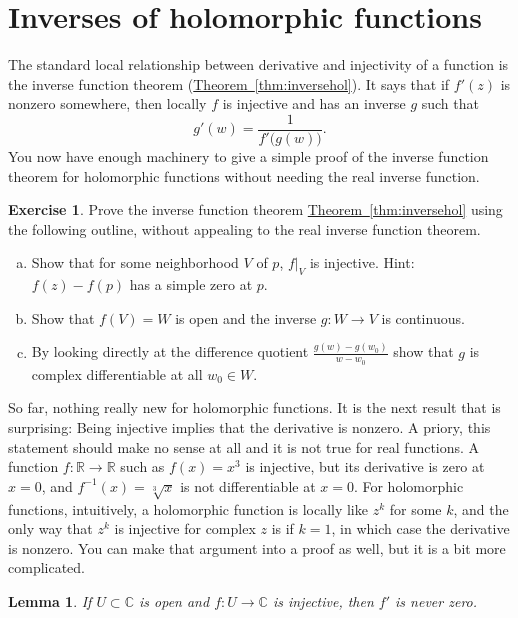 \documentclass[12pt,openany]{book}
\newcommand{\C}{{\mathbb{C}}}
\newcommand{\R}{{\mathbb{R}}}
\theoremstyle{plain}
\newtheorem{lemma}[thm]{Lemma}
\theoremstyle{remark}
\theoremstyle{definition}
\newenvironment{exbox}{%
    \def\FrameCommand{\vrule width 1pt \relax\hspace{10pt}}%
    \MakeFramed{\advance\hsize-\width\FrameRestore}%
}{%
    \endMakeFramed
}
\newenvironment{exparts}{%
    \leavevmode\begin{enumerate}[a),noitemsep,topsep=0pt,parsep=0pt,partopsep=0pt]
}{%
    \end{enumerate}
}
\theoremstyle{exercise}
\newtheorem{exercise}{Exercise}[section]
\theoremstyle{example}
\newcommand{\thmref}[1]{\hyperref[#1]{Theorem~\ref*{#1}}}
\begin{document}
\section{Inverses of holomorphic functions} \label{sec:inverses}

The standard local relationship between derivative and injectivity of a
function is the inverse function theorem (\thmref{thm:inversehol}).
It says that if $f'(z)$ is nonzero somewhere, then locally $f$ is
injective and has an inverse $g$ such that
\begin{equation*}
g'(w) = \frac{1}{f'\bigl(g(w)\bigr)} .
\end{equation*}
You now have enough machinery to give a simple proof
of the inverse function theorem for holomorphic functions
without needing the real inverse function.

\begin{exbox}
\begin{exercise}
Prove the inverse function theorem \thmref{thm:inversehol}
using the following outline, without appealing to the real inverse function
theorem.
\begin{exparts}
\item Show that for some neighborhood $V$ of $p$, $f|_V$ is injective.
Hint: $f(z)-f(p)$ has a simple zero at $p$.
\item Show that $f(V) = W$ is open and the inverse $g \colon W \to V$ is
continuous.
\item By looking directly at the difference quotient $\frac{g(w)-g(w_0)}{w-w_0}$
show that $g$ is complex differentiable at all $w_0 \in W$.
\end{exparts}
\end{exercise}
\end{exbox}

So far, nothing really new for holomorphic functions.
It is the next
result that is surprising: Being injective
implies that the derivative is nonzero.
A priory, this statement should make no sense at all and it is not true for real functions.
A function $f \colon \R \to \R$ such as $f(x) = x^3$
is injective, but its derivative is zero at $x=0$, and $f^{-1}(x) =
\sqrt[3]{x}$ is not differentiable at $x=0$.
For holomorphic functions, intuitively, a holomorphic function is
locally like $z^k$ for some $k$, and the only way that $z^k$ is injective
for complex $z$ is
if $k=1$, in which case the derivative is nonzero.
You can make that
argument into a proof as well, but it is a bit more complicated.

\begin{lemma} \label{lemma:dernonzero}
If $U \subset \C$ is open and $f \colon U \to \C$ is injective, then
$f'$ is never zero.
\end{lemma}
\end{document}
